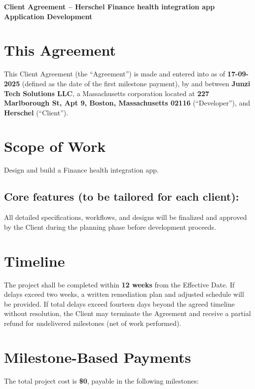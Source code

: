 \documentclass[11pt,letterpaper]{article}
\newcommand{\ClientName}{Herschel}
\newcommand{\AppName}{Finance health integration app}
\newcommand{\EffectiveDate}{17-09-2025}
\newcommand{\TimeLine}{12 weeks}
\newcommand{\TotalCost}{0}
\newcommand{\FeaturesListPlaceholder}{}
\newcommand{\ScopeDescription}{Design and build a Finance health integration app.}
\begin{document}
\begin{center}
\Large\textbf{Client Agreement -- \ClientName{} \AppName{} Application Development}
\end{center}

\vspace{1em}

\section*{This Agreement}
This Client Agreement (the ``Agreement'') is made and entered into as of \textbf{\EffectiveDate{}} (defined as the date of the first milestone payment), by and between \textbf{Junzi Tech Solutions LLC}, a Massachusetts corporation located at \textbf{227 Marlborough St, Apt 9, Boston, Massachusetts 02116} (``Developer''), and \textbf{\ClientName{}} (``Client'').

\section{Scope of Work}
\ScopeDescription{}

\subsection*{Core features (to be tailored for each client):}
\FeaturesListPlaceholder{}

All detailed specifications, workflows, and designs will be finalized and approved by the Client during the planning phase before development proceeds.

\section{Timeline}
The project shall be completed within \textbf{\TimeLine{}} from the Effective Date. If delays exceed two weeks, a written remediation plan and adjusted schedule will be provided. If total delays exceed fourteen days beyond the agreed timeline without resolution, the Client may terminate the Agreement and receive a partial refund for undelivered milestones (net of work performed).

\section{Milestone-Based Payments}
The total project cost is \textbf{\$\TotalCost{}}, payable in the following milestones:
\end{document}
